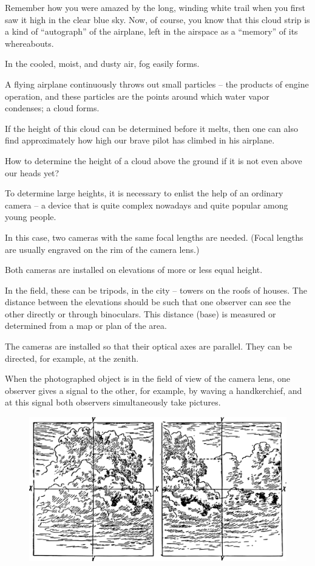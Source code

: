 Remember how you were amazed by the long, winding white trail when you first saw it high in the clear blue sky. Now, of course, you know that this cloud strip is a kind of ``autograph'' of the airplane, left in the airspace as a ``memory'' of its whereabouts. 

In the cooled, moist, and dusty air, fog easily forms. 

A flying airplane continuously throws out small particles -- the products of engine operation, and these particles are the points around which water vapor condenses; a cloud forms. 

If the height of this cloud can be determined before it melts, then one can also find approximately how high our brave pilot has climbed in his airplane. 

\ques How to determine the height of a cloud above the ground if it is not even above our heads yet?

\ans To determine large heights, it is necessary to enlist the help of an ordinary camera -- a device that is quite complex nowadays and quite popular among young people.

In this case, two cameras with the same focal lengths are needed. (Focal lengths are usually engraved on the rim of the camera lens.)

Both cameras are installed on elevations of more or less equal height.

In the field, these can be tripods, in the city -- towers on the roofs of houses. The distance between the elevations should be such that one observer can see the other directly or through binoculars. This distance (base) is measured or determined from a map or plan of the area.

The cameras are installed so that their optical axes are parallel. They can be directed, for example, at the zenith.

When the photographed object is in the field of view of the camera lens, one observer gives a signal to the other, for example, by waving a handkerchief, and at this signal both observers simultaneously take pictures.

\begin{figure}[h!]
\centering
\includegraphics[width=\textwidth]{figures/ch-03/fig-076.pdf}
\end{figure}

